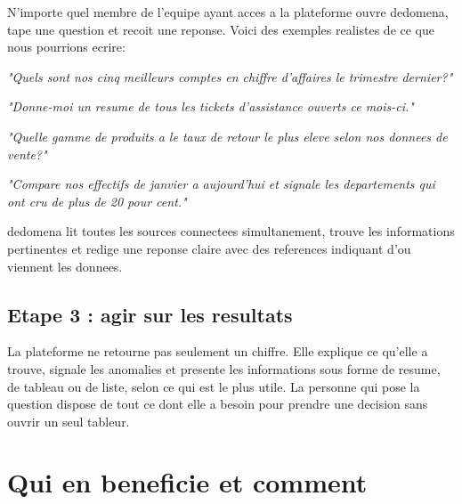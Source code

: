 \documentclass[12pt, a4paper]{article}
\begin{document}
N'importe quel membre de l'equipe ayant acces a la plateforme ouvre dedomena,
tape une question et recoit une reponse. Voici des exemples realistes de ce que
nous pourrions ecrire:

\begin{highlight}
  \textit{"Quels sont nos cinq meilleurs comptes en chiffre d'affaires le trimestre dernier?"}

  \vspace{0.4em}
  \textit{"Donne-moi un resume de tous les tickets d'assistance ouverts ce mois-ci."}

  \vspace{0.4em}
  \textit{"Quelle gamme de produits a le taux de retour le plus eleve selon nos donnees de vente?"}

  \vspace{0.4em}
  \textit{"Compare nos effectifs de janvier a aujourd'hui et signale les departements
           qui ont cru de plus de 20 pour cent."}
\end{highlight}

dedomena lit toutes les sources connectees simultanement, trouve les informations
pertinentes et redige une reponse claire avec des references indiquant d'ou
viennent les donnees.

\subsection{Etape 3 : agir sur les resultats}

La plateforme ne retourne pas seulement un chiffre. Elle explique ce qu'elle a
trouve, signale les anomalies et presente les informations sous forme de resume,
de tableau ou de liste, selon ce qui est le plus utile. La personne qui pose la
question dispose de tout ce dont elle a besoin pour prendre une decision sans
ouvrir un seul tableur.


\section{Qui en beneficie et comment}
\end{document}
